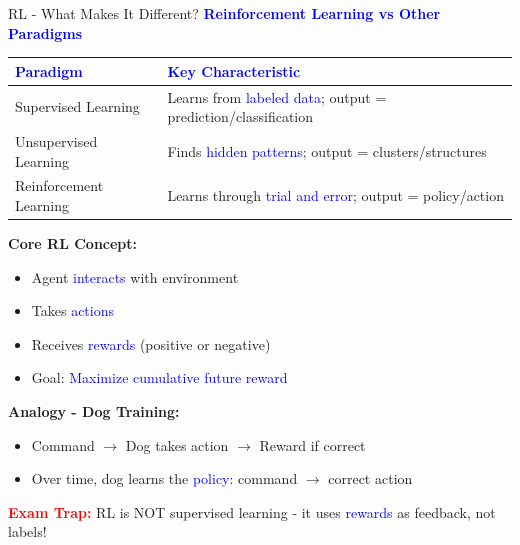 \documentclass[8pt]{beamer}
\begin{document}
	\begin{frame}{RL - What Makes It Different?}
		\fontsize{6.5}{7.5}\selectfont
		\textcolor{blue}{\textbf{Reinforcement Learning vs Other Paradigms}}
		
		\begin{tabular}{|p{3.5cm}|p{5.5cm}|}
			\hline
			\textcolor{blue}{Paradigm} & \textcolor{blue}{Key Characteristic} \\
			\hline
			Supervised Learning & Learns from \textcolor{blue}{labeled data}; output = prediction/classification \\
			\hline
			Unsupervised Learning & Finds \textcolor{blue}{hidden patterns}; output = clusters/structures \\
			\hline
			Reinforcement Learning & Learns through \textcolor{blue}{trial and error}; output = policy/action \\
			\hline
		\end{tabular}
		
		\textbf{Core RL Concept:}
		\begin{itemize}
			\item Agent \textcolor{blue}{interacts} with environment
			\item Takes \textcolor{blue}{actions}
			\item Receives \textcolor{blue}{rewards} (positive or negative)
			\item Goal: \textcolor{blue}{Maximize cumulative future reward}
		\end{itemize}
		
		\textbf{Analogy - Dog Training:}
		\begin{itemize}
			\item Command $\rightarrow$ Dog takes action $\rightarrow$ Reward if correct
			\item Over time, dog learns the \textcolor{blue}{policy}: command $\rightarrow$ correct action
		\end{itemize}
		
		\textcolor{red}{\textbf{Exam Trap:}} RL is NOT supervised learning - it uses \textcolor{blue}{rewards} as feedback, not labels!
	\end{frame}
	
\end{document}
